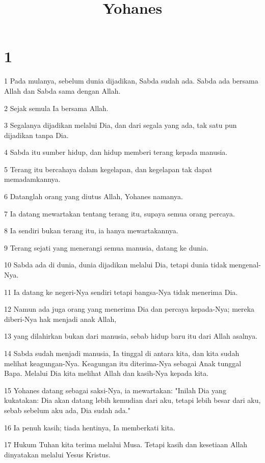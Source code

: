 

\title{Yohanes}


\chapter{1}

\par 1 Pada mulanya, sebelum dunia dijadikan, Sabda sudah ada. Sabda ada bersama Allah dan Sabda sama dengan Allah.
\par 2 Sejak semula Ia bersama Allah.
\par 3 Segalanya dijadikan melalui Dia, dan dari segala yang ada, tak satu pun dijadikan tanpa Dia.
\par 4 Sabda itu sumber hidup, dan hidup memberi terang kepada manusia.
\par 5 Terang itu bercahaya dalam kegelapan, dan kegelapan tak dapat memadamkannya.
\par 6 Datanglah orang yang diutus Allah, Yohanes namanya.
\par 7 Ia datang mewartakan tentang terang itu, supaya semua orang percaya.
\par 8 Ia sendiri bukan terang itu, ia hanya mewartakannya.
\par 9 Terang sejati yang menerangi semua manusia, datang ke dunia.
\par 10 Sabda ada di dunia, dunia dijadikan melalui Dia, tetapi dunia tidak mengenal-Nya.
\par 11 Ia datang ke negeri-Nya sendiri tetapi bangsa-Nya tidak menerima Dia.
\par 12 Namun ada juga orang yang menerima Dia dan percaya kepada-Nya; mereka diberi-Nya hak menjadi anak Allah,
\par 13 yang dilahirkan bukan dari manusia, sebab hidup baru itu dari Allah asalnya.
\par 14 Sabda sudah menjadi manusia, Ia tinggal di antara kita, dan kita sudah melihat keagungan-Nya. Keagungan itu diterima-Nya sebagai Anak tunggal Bapa. Melalui Dia kita melihat Allah dan kasih-Nya kepada kita.
\par 15 Yohanes datang sebagai saksi-Nya, ia mewartakan: "Inilah Dia yang kukatakan: Dia akan datang lebih kemudian dari aku, tetapi lebih besar dari aku, sebab sebelum aku ada, Dia sudah ada."
\par 16 Ia penuh kasih; tiada hentinya, Ia memberkati kita.
\par 17 Hukum Tuhan kita terima melalui Musa. Tetapi kasih dan kesetiaan Allah dinyatakan melalui Yesus Kristus.
